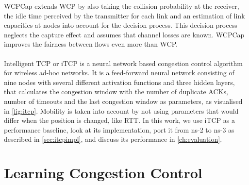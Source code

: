WCPCap extends WCP by also taking the collision probability at the receiver, the idle time perceived by the transmitter for each link and an estimation of link capacities at nodes into account for the decision process. This decision process neglects the capture effect and assumes that channel losses are known. WCPCap improves the fairness between flows even more than WCP.
\\\\ 
Intelligent TCP \cite{iTCP} or iTCP is a neural network based congestion control algorithm for wireless ad-hoc networks. It is a feed-forward neural network consisting of nine nodes with several different activation functions and three hidden layers,  that calculates the congestion window with the number of duplicate ACKs, number of timeouts and the last congestion window as parameters, as visualised in \autoref{fig:itcp}. Mobility is taken into account by not using parameters that would differ when the position is changed, like RTT. In this work, we use iTCP as a performance baseline, look at its implementation, port it from ns-2 to ns-3 as described in \autoref{sec:itcpimpl}, and discuss its performance in \autoref{ch:evaluation}.

\section{Learning Congestion Control}
\label{sec:rel_learning_networks}

